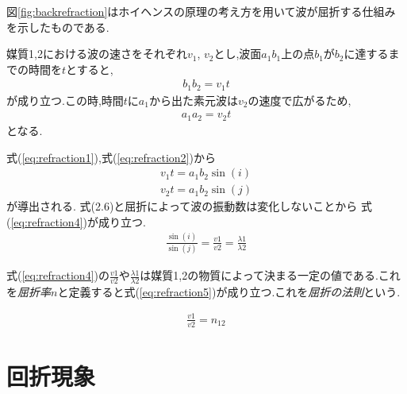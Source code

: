 図\ref{fig:backrefraction}はホイヘンスの原理の考え方を用いて波が屈折する仕組みを示したものである.

媒質1,2における波の速さをそれぞれ$v_{1}$, $v_{2}$とし,波面$a_{1}b_{1}$上の点$b_{1}$が$b_{2}$に達するまでの時間を$t$とすると,
\begin{eqnarray}
\label{eq:refraction1}
b_1 b_2=v_1 t
\end{eqnarray}
が成り立つ.この時,時間$t$に$a_{1}$から出た素元波は$v_{2}$の速度で広がるため,
\begin{eqnarray}
\label{eq:refraction2}
a_1a_2=v_2t
\end{eqnarray}
となる.

式(\ref{eq:refraction1}),式(\ref{eq:refraction2})から
\begin{eqnarray}
v_1t=a_1b_2\sin(i) \\ \nonumber
v_2t=a_1b_2\sin(j)
\label{eq:refraction3}
\end{eqnarray}
が導出される.
式(2.6)と屈折によって波の振動数は変化しないことから
式(\ref{eq:refraction4})が成り立つ.
\begin{eqnarray}
\label{eq:refraction4}
\frac{\sin(i)}{\sin(j)}=\frac{v1}{v2}=\frac{\lambda1}{\lambda2}
\end{eqnarray}

式(\ref{eq:refraction4})の$\frac{v1}{v2}$や$\frac{\lambda1}{\lambda2}$は媒質1,2の物質によって決まる一定の値である.これを\emph{屈折率$n$}と定義すると式(\ref{eq:refraction5})が成り立つ.これを\emph{屈折の法則}という.

\begin{eqnarray}
\label{eq:refraction5}
\frac{v1}{v2} = n_{12}
\end{eqnarray}



\section{回折現象}
